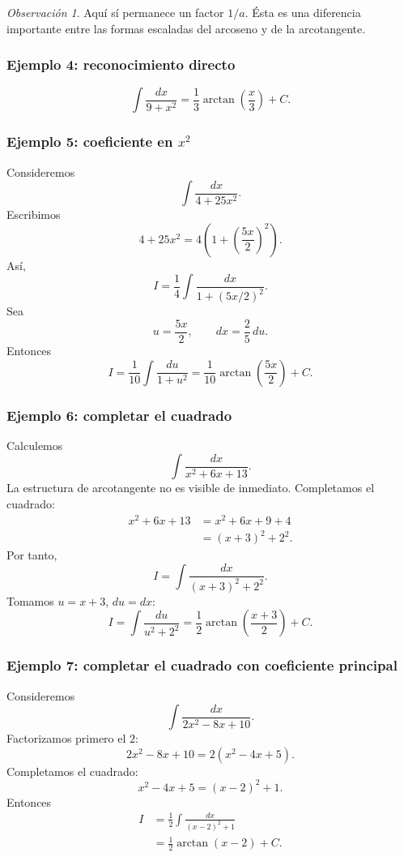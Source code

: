 \documentclass[12pt]{article}
\theoremstyle{definition}
\theoremstyle{remark}
\newtheorem*{observacion}{Observación}
\begin{document}
\begin{observacion}
Aquí sí permanece un factor $1/a$. Ésta es una diferencia importante entre
las formas escaladas del arcoseno y de la arcotangente.
\end{observacion}

\subsubsection*{Ejemplo 4: reconocimiento directo}
\[
\int\frac{dx}{9+x^2}
=\boxed{\frac13\arctan\left(\frac{x}{3}\right)+C}.
\]

\subsubsection*{Ejemplo 5: coeficiente en \texorpdfstring{$x^2$}{x2}}
Consideremos
\[
\int\frac{dx}{4+25x^2}.
\]
Escribimos
\[
4+25x^2=4\left(1+\left(\frac{5x}{2}\right)^2\right).
\]
Así,
\[
I=\frac14\int\frac{dx}{1+(5x/2)^2}.
\]
Sea
\[
u=\frac{5x}{2},\qquad dx=\frac25\,du.
\]
Entonces
\[
I=\frac1{10}\int\frac{du}{1+u^2}
=\boxed{\frac1{10}\arctan\left(\frac{5x}{2}\right)+C}.
\]

\subsubsection*{Ejemplo 6: completar el cuadrado}
Calculemos
\[
\int\frac{dx}{x^2+6x+13}.
\]
La estructura de arcotangente no es visible de inmediato. Completamos el
cuadrado:
\begin{align*}
x^2+6x+13
&=x^2+6x+9+4\\
&=(x+3)^2+2^2.
\end{align*}
Por tanto,
\[
I=\int\frac{dx}{(x+3)^2+2^2}.
\]
Tomamos $u=x+3$, $du=dx$:
\[
I=\int\frac{du}{u^2+2^2}
=\boxed{\frac12\arctan\left(\frac{x+3}{2}\right)+C}.
\]

\subsubsection*{Ejemplo 7: completar el cuadrado con coeficiente principal}
Consideremos
\[
\int\frac{dx}{2x^2-8x+10}.
\]
Factorizamos primero el $2$:
\[
2x^2-8x+10=2(x^2-4x+5).
\]
Completamos el cuadrado:
\[
x^2-4x+5=(x-2)^2+1.
\]
Entonces
\begin{align*}
I
&=\frac12\int\frac{dx}{(x-2)^2+1}\\
&=\boxed{\frac12\arctan(x-2)+C}.
\end{align*}

\end{document}
